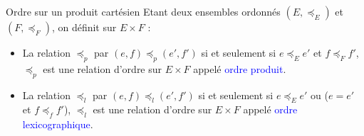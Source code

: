 \documentclass[10pt]{beamer}
\begin{document}
\begin{frame}[fragile]{\Ctitle}{\stitle}
	\begin{alertblock}{Ordre sur un produit cartésien}
		Etant deux ensembles ordonnés $(E, \preccurlyeq_E)$ et $(F, \preccurlyeq_F)$, on définit sur $E \times F$ :
		\begin{itemize}
			\item<2-> La relation $\preccurlyeq_p$ par $(e,f) \preccurlyeq_p (e',f')$ si et seulement si $e \preccurlyeq_E e'$ et $f \preccurlyeq_F f'$, $\preccurlyeq_p$ est une relation d'ordre sur  $E \times F$ appelé \textcolor{blue}{ordre produit}.
			\item<3-> La relation $\preccurlyeq_l$ par $(e,f) \preccurlyeq_l (e',f')$ si et seulement si $e \preccurlyeq_E e'$ ou ($e = e'$ et $f \preccurlyeq_f f'$),  $\preccurlyeq_l$ est une relation d'ordre sur $E \times F$ appelé \textcolor{blue}{ordre lexicographique}.
		\end{itemize}
	\end{alertblock}
\end{frame}
\end{document}
